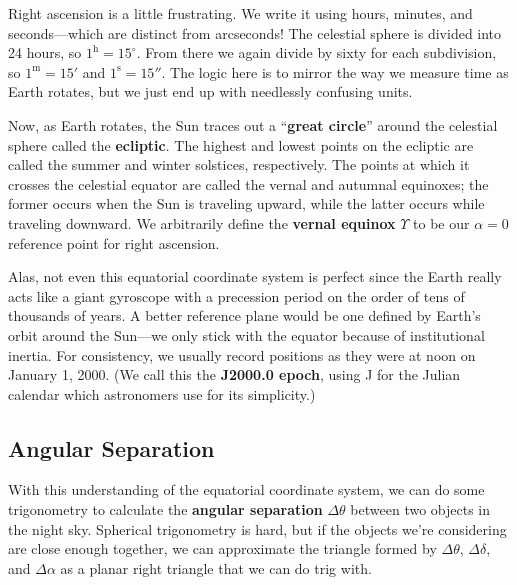 \documentclass[../a062main.tex]{subfiles}
\begin{document}
Right ascension is a little frustrating.
We write it using hours, minutes, and seconds---which are distinct from arcseconds!
The celestial sphere is divided into 24 hours, so $1^\text{h} = 15^\circ$.
From there we again divide by sixty for each subdivision, so $1^\text{m} = 15'$ and $1^\text{s} = 15''$.
The logic here is to mirror the way we measure time as Earth rotates, but we just end up with needlessly confusing units.

Now, as Earth rotates, the Sun traces out a ``\textbf{great circle}'' around the celestial sphere called the \textbf{ecliptic}.
The highest and lowest points on the ecliptic are called the summer and winter solstices, respectively.
The points at which it crosses the celestial equator are called the vernal and autumnal equinoxes; the former occurs when the Sun is traveling upward, while the latter occurs while traveling downward.
We arbitrarily define the \textbf{vernal equinox} $\Upsilon$ to be our $\alpha = 0$ reference point for right ascension.

Alas, not even this equatorial coordinate system is perfect since the Earth really acts like a giant gyroscope with a precession period on the order of tens of thousands of years.
A better reference plane would be one defined by Earth's orbit around the Sun---we only stick with the equator because of institutional inertia.
For consistency, we usually record positions as they were at noon on January 1, 2000.
(We call this the \textbf{J2000.0 epoch}, using J for the Julian calendar which astronomers use for its simplicity.)

\subsection*{Angular Separation}
With this understanding of the equatorial coordinate system, we can do some trigonometry to calculate the \textbf{angular separation} $\Delta \theta$ between two objects in the night sky.
Spherical trigonometry is hard, but if the objects we're considering are close enough together, we can approximate the triangle formed by $\Delta \theta$, $\Delta \delta$, and $\Delta \alpha$ as a planar right triangle that we can do trig with.
\end{document}

